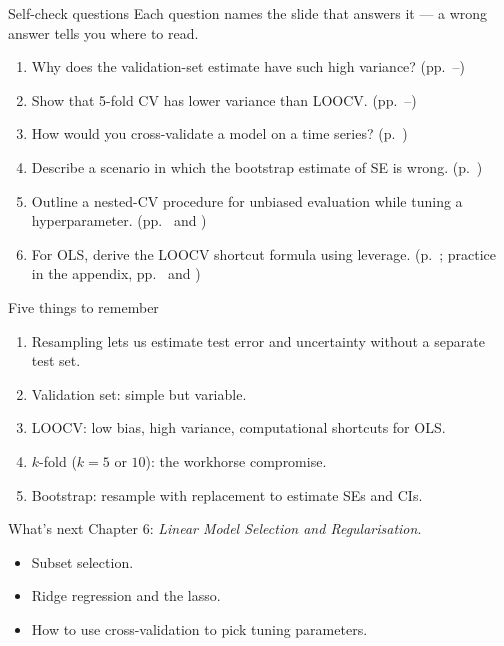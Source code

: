 \documentclass[aspectratio=169,11pt]{beamer}
\begin{document}
\begin{frame}{Self-check questions}
  Each question names the slide that answers it --- a wrong answer tells you
  where to read.
  \begin{enumerate}
    \item Why does the validation-set estimate have such high variance?
          (pp.~\pageref{frm:valprocon}--\pageref{frm:valerratic})
    \item Show that 5-fold CV has lower variance than LOOCV.
          (pp.~\pageref{frm:loocvkfold}--\pageref{frm:k10})
    \item How would you cross-validate a model on a time series?
          (p.~\pageref{frm:cvpitfalls})
    \item Describe a scenario in which the bootstrap estimate of SE is
          wrong. (p.~\pageref{frm:bootfails})
    \item Outline a nested-CV procedure for unbiased evaluation while
          tuning a hyperparameter. (pp.~\pageref{frm:cvpitfalls} and \pageref{frm:ee53})
    \item For OLS, derive the LOOCV shortcut formula using leverage.
          (p.~\pageref{frm:shortcut}; practice in the appendix, pp.~\pageref{frm:ex52} and \pageref{frm:ee51})
  \end{enumerate}
\end{frame}

\begin{frame}{Five things to remember}
  \begin{enumerate}
    \item Resampling lets us estimate test error and uncertainty
          without a separate test set.
    \item Validation set: simple but variable.
    \item LOOCV: low bias, high variance, computational shortcuts for
          OLS.
    \item $k$-fold ($k = 5$ or $10$): the workhorse compromise.
    \item Bootstrap: resample with replacement to estimate SEs and
          CIs.
  \end{enumerate}
\end{frame}

\begin{frame}{What's next}
  Chapter 6: \emph{Linear Model Selection and Regularisation}.
  \begin{itemize}
    \item Subset selection.
    \item Ridge regression and the lasso.
    \item How to use cross-validation to pick tuning parameters.
  \end{itemize}
\end{frame}
\end{document}
